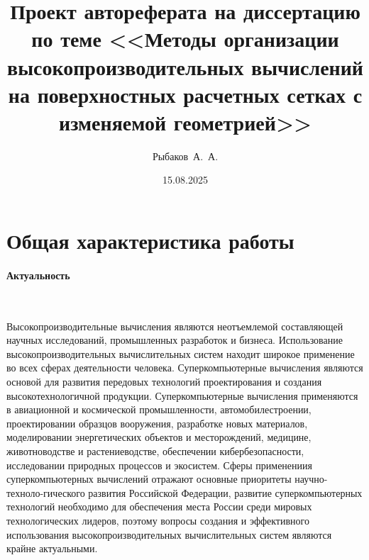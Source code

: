 \documentclass[a4paper,14pt]{extarticle}                     %
\theoremstyle{plain}                                         %
\begin{document}

\title{Проект автореферата на диссертацию по теме <<Методы организации высокопроизводительных вычислений на поверхностных расчетных сетках с изменяемой геометрией>>}
\author{Рыбаков~А.~А.}
\date{15.08.2025}
\maketitle
\thispagestyle{empty}                                        %


\newpage
\section*{Общая характеристика работы}

\paragraph{Актуальность}

\

Высокопроизводительные вычисления являются неотъемлемой составляющей научных исследований, промышленных разработок и бизнеса.
Использование высокопроизводительных вычислительных систем находит широкое применение во всех сферах деятельности человека.
Суперкомпьютерные вычисления являются основой для развития передовых технологий проектирования и создания высокотехнологичной продукции.
Суперкомпьютерные вычисления применяются в авиационной и космической промышленности, автомобилестроении, проектировании образцов вооружения, разработке новых материалов, моделировании энергетических объектов и месторождений, медицине, животноводстве и растениеводстве, обеспечении кибербезопасности, исследовании природных процессов и экосистем.
Сферы применениия суперкомпьютерных вычислений отражают основные приоритеты научно-техноло-гического развития Российской Федерации, развитие суперкомпьютерных технологий необходимо для обеспечения места России среди мировых технологических лидеров, поэтому вопросы создания и эффективного использования высокопроизводительных вычислительных систем являются крайне актуальными.
\end{document}
